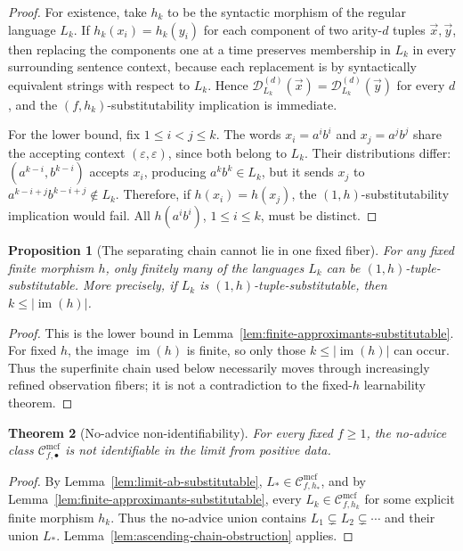 \documentclass[11pt,a4paper]{article}
\newtheorem{theorem}{Theorem}[section]
\newtheorem{proposition}[theorem]{Proposition}
\theoremstyle{remark}
\newcommand{\Cmcf}[2]{\mathcal{C}^{\mathrm{mcf}}_{#1,#2}}
\newcommand{\D}{\mathcal{D}}
\newcommand{\tuple}[1]{\vec{#1}}
\newcommand{\eps}{\varepsilon}
\begin{document}
\begin{proof}
For existence, take \(h_k\) to be the syntactic morphism of the regular language
\(L_k\).  If \(h_k(x_i)=h_k(y_i)\) for each component of two arity-\(d\) tuples
\(\tuple x,\tuple y\), then replacing the components one at a time preserves
membership in \(L_k\) in every surrounding sentence context, because each
replacement is by syntactically equivalent strings with respect to \(L_k\).
Hence \(\D_{L_k}^{(d)}(\tuple x)=\D_{L_k}^{(d)}(\tuple y)\) for every \(d\), and
the \((f,h_k)\)-substitutability implication is immediate.

For the lower bound, fix \(1\le i<j\le k\).  The words
\(x_i=a^i b^i\) and \(x_j=a^j b^j\) share the accepting context
\((\eps,\eps)\), since both belong to \(L_k\).  Their distributions differ:
\((a^{k-i},b^{k-i})\) accepts \(x_i\), producing \(a^k b^k\in L_k\), but it
sends \(x_j\) to \(a^{k-i+j}b^{k-i+j}\notin L_k\).  Therefore, if
\(h(x_i)=h(x_j)\), the \((1,h)\)-substitutability implication would fail.  All
\(h(a^i b^i)\), \(1\le i\le k\), must be distinct.
\end{proof}

\begin{proposition}[The separating chain cannot lie in one fixed fiber]
\label{prop:separating-chain-not-one-fiber}
For any fixed finite morphism \(h\), only finitely many of the languages
\(L_k\) can be \((1,h)\)-tuple-substitutable.  More precisely, if
\(L_k\) is \((1,h)\)-tuple-substitutable, then \(k\le |\operatorname{im}(h)|\).
\end{proposition}

\begin{proof}
This is the lower bound in Lemma~\ref{lem:finite-approximants-substitutable}.
For fixed \(h\), the image \(\operatorname{im}(h)\) is finite, so only those
\(k\le |\operatorname{im}(h)|\) can occur.  Thus the superfinite chain used
below necessarily moves through increasingly refined observation fibers; it is
not a contradiction to the fixed-\(h\) learnability theorem.
\end{proof}

\begin{theorem}[No-advice non-identifiability]
\label{thm:no-advice-nonidentifiability}
For every fixed \(f\ge1\), the no-advice class \(\Cmcf{f}{\bullet}\) is not
identifiable in the limit from positive data.
\end{theorem}

\begin{proof}
By Lemma~\ref{lem:limit-ab-substitutable},
\(L_*\in\Cmcf{f}{h_*}\), and by
Lemma~\ref{lem:finite-approximants-substitutable}, every
\(L_k\in\Cmcf{f}{h_k}\) for some explicit finite morphism \(h_k\).  Thus the
no-advice union contains \(L_1\subsetneq L_2\subsetneq\cdots\) and their union
\(L_*\).  Lemma~\ref{lem:ascending-chain-obstruction} applies.
\end{proof}
\end{document}
